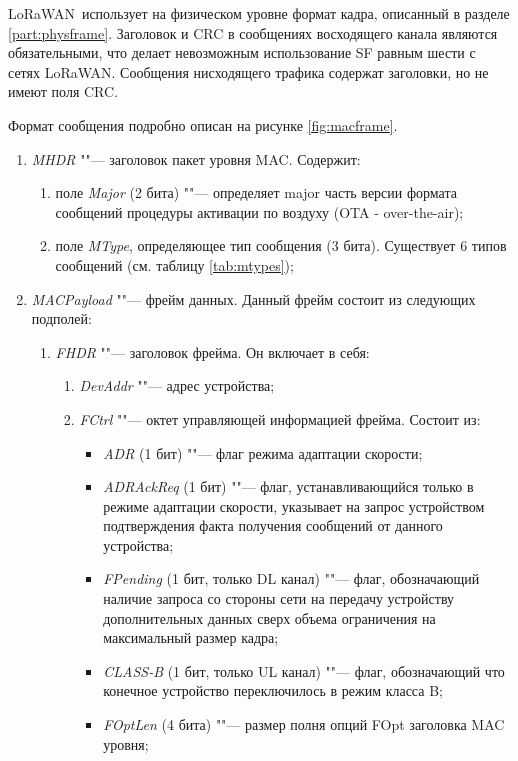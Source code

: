 LoRaWAN\texttrademark~использует на физическом уровне формат кадра, описанный в 
разделе \ref{part:physframe}.
Заголовок и CRC в сообщениях восходящего канала являются обязательными, что 
делает невозможным использование SF равным шести с сетях LoRaWAN\texttrademark.
Сообщения нисходящего трафика содержат заголовки, но не имеют поля CRC.

Формат сообщения подробно описан на рисунке \ref{fig:macframe}.

\begin{enumerate}
 \item \textit{MHDR} ""--- заголовок пакет уровня MAC. Содержит:
 
 \begin{enumerate}
  \item поле \textit{Major} (2 бита) ""--- определяет major часть версии 
формата 
сообщений процедуры активации по воздуху (OTA - over-the-air);
  \item поле \textit{MType}, определяющее тип сообщения (3 бита). Существует 6 
типов сообщений (см. таблицу \ref{tab:mtypes});
 \end{enumerate}
 
 \item \textit{MACPayload} ""--- фрейм данных. Данный фрейм состоит из 
следующих подполей:
 
 \begin{enumerate}
  \item \textit{FHDR} ""--- заголовок фрейма. Он включает в себя:
  
  \begin{enumerate}
   \item \textit{DevAddr} ""--- адрес устройства;
   \item \textit{FCtrl} ""--- октет управляющей информацией фрейма. Состоит из:
   
   \begin{itemize}
    \item \textit{ADR} (1 бит) ""--- флаг режима адаптации скорости;
    \item \textit{ADRAckReq} (1 бит) ""--- флаг, устанавливающийся только в 
режиме адаптации скорости, указывает на запрос устройством подтверждения факта 
получения сообщений от данного устройства;
    \item \textit{FPending} (1 бит, только DL канал) ""--- флаг, обозначающий 
наличие запроса со стороны сети на передачу устройству дополнительных данных 
сверх объема ограничения на максимальный размер кадра;
    \item \textit{CLASS-B} (1 бит, только UL канал) ""--- флаг, обозначающий 
что 
конечное устройство переключилось в режим класса B;
    \item \textit{FOptLen} (4 бита) ""--- размер полня опций FOpt заголовка MAC 
уровня;
   \end{itemize}
   

\end{enumerate}
\end{enumerate}
\end{enumerate}
